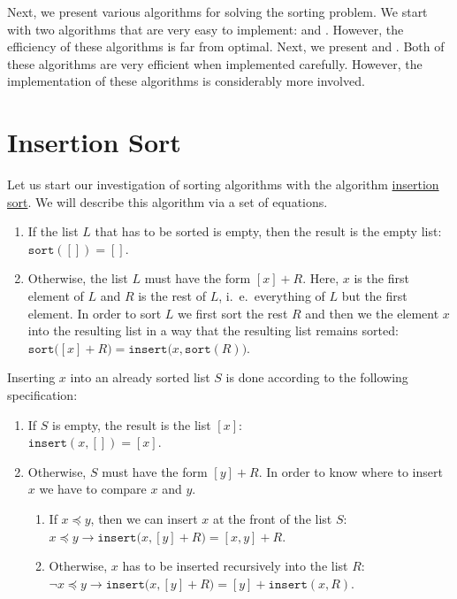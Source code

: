 Next, we present various algorithms for solving the sorting problem.  We start with two algorithms
that are very easy to implement:  and .  However, the
efficiency of these algorithms is far from optimal.  Next, we present  and 
.  Both of these algorithms are very efficient when implemented carefully.
However, the implementation of these algorithms is considerably more involved.


\section{Insertion Sort \label{sec:insertionSort}}
Let us start our investigation of sorting algorithms with the algorithm
\href{http://en.wikipedia.org/wiki/Insertion_sort}{insertion sort}.
We will describe this algorithm via a set of equations.
\begin{enumerate}
\item If the list $L$ that has to be sorted is empty, then the result is the empty list: 
      \\[0.2cm]
      \hspace*{1.3cm}
      $\mathtt{sort}([]) = []$.
\item Otherwise, the list $L$ must have the form $[x] + R$. Here, $x$ is the first element of $L$
      and $R$ is the rest of $L$, i.~e.~everything of $L$ but the first element.  In order to sort
      $L$ we first sort the rest $R$ and then we  the element $x$ into the resulting list in a
      way that the resulting list remains sorted:
      \\[0.2cm]
      \hspace*{1.3cm} $\mathtt{sort}\bigl([x] + R\bigr) = \mathtt{insert}\bigl(x, \mathtt{sort}(R)\bigr)$.
\end{enumerate}
Inserting $x$ into an already sorted list $S$ is done according to the following specification:
\begin{enumerate}
\item If $S$ is empty, the result is the list $[x]$: \\[0.2cm]
      \hspace*{1.3cm}
      $\mathtt{insert}(x,[]) = [x]$.
\item Otherwise, $S$ must have the form $[y] + R$.  In order to know where to insert $x$ we have to
      compare $x$ and $y$.
      \begin{enumerate}
      \item If $x \preceq y$, then we can insert $x$ at the front of the list $S$: \\[0.2cm]
            \hspace*{1.3cm}
            $x \preceq y \rightarrow \mathtt{insert}\bigl(x, [y] + R\bigr) = [x,y] + R$. 
      \item Otherwise, $x$ has to be inserted recursively into the list $R$: \\[0.2cm]
            \hspace*{1.3cm}
            $\neg x \preceq y \rightarrow \mathtt{insert}\bigl(x, [y] + R\bigr) = [y] + \mathtt{insert}(x,R)$. 
      \end{enumerate}
\end{enumerate}

